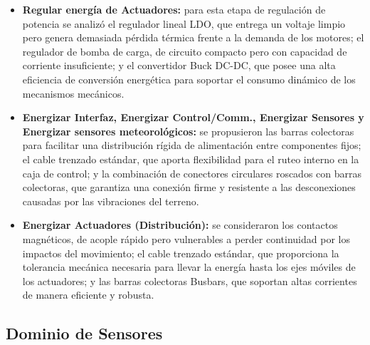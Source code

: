 \begin{itemize}
	\item \textbf{Regular energía de Actuadores:} para esta etapa de regulación de potencia se analizó el regulador lineal LDO, que entrega un voltaje limpio pero genera demasiada pérdida térmica frente a la demanda de los motores; el regulador de bomba de carga, de circuito compacto pero con capacidad de corriente insuficiente; y el convertidor Buck DC-DC, que posee una alta eficiencia de conversión energética para soportar el consumo dinámico de los mecanismos mecánicos.
	
	\item \textbf{Energizar Interfaz, Energizar Control/Comm., Energizar Sensores y Energizar sensores meteorológicos:} se propusieron las barras colectoras para facilitar una distribución rígida de alimentación entre componentes fijos; el cable trenzado estándar, que aporta flexibilidad para el ruteo interno en la caja de control; y la combinación de conectores circulares roscados con barras colectoras, que garantiza una conexión firme y resistente a las desconexiones causadas por las vibraciones del terreno.
	
	\item \textbf{Energizar Actuadores (Distribución):} se consideraron los contactos magnéticos, de acople rápido pero vulnerables a perder continuidad por los impactos del movimiento; el cable trenzado estándar, que proporciona la tolerancia mecánica necesaria para llevar la energía hasta los ejes móviles de los actuadores; y las barras colectoras Busbars, que soportan altas corrientes de manera eficiente y robusta.
\end{itemize}


\subsection{Dominio de Sensores}


